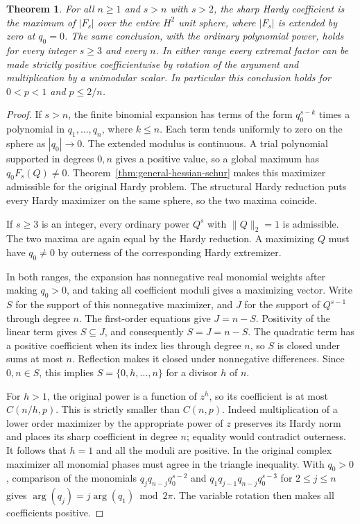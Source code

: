 \documentclass[11pt]{article}
\newtheorem{theorem}{Theorem}
\begin{document}
\begin{theorem}\label{thm:general-small-positive}
For all \(n\ge1\) and \(s>n\) with \(s>2\), the sharp Hardy
coefficient is the maximum of \(|F_s|\) over the entire
\(H^2\) unit sphere, where \(|F_s|\) is extended by zero at
\(q_0=0\). The same conclusion, with the ordinary polynomial
power, holds for every integer \(s\ge3\) and every \(n\).
In either range every extremal factor can be made strictly
positive coefficientwise by rotation of the argument and
multiplication by a unimodular scalar. In particular this
conclusion holds for \(0<p<1\) and \(p\le 2/n\).
\end{theorem}

\begin{proof}
If \(s>n\), the finite binomial expansion has terms of the
form \(q_0^{s-k}\) times a polynomial in \(q_1,\ldots,q_n\),
where \(k\le n\). Each term tends uniformly to zero on the
sphere as \(|q_0|\to0\). The extended modulus is continuous.
A trial polynomial supported in degrees \(0,n\) gives a
positive value, so a global maximum has \(q_0F_s(Q)\ne0\).
Theorem~\ref{thm:general-hessian-schur} makes this maximizer
admissible for the original Hardy problem. The structural
Hardy reduction puts every Hardy maximizer on the same sphere,
so the two maxima coincide.

If \(s\ge3\) is an integer, every ordinary power \(Q^s\) with
\(\|Q\|_2=1\) is admissible. The two maxima are again equal by
the Hardy reduction. A maximizing \(Q\) must have \(q_0\ne0\)
by outerness of the corresponding Hardy extremizer.

In both ranges, the expansion has nonnegative real
monomial weights after making \(q_0>0\), and taking all
coefficient moduli gives a maximizing vector. Write \(S\)
for the support of this nonnegative maximizer, and \(J\)
for the support of \(Q^{s-1}\) through degree \(n\).
The first-order equations give \(J=n-S\). Positivity of the
linear term gives \(S\subseteq J\), and consequently
\(S=J=n-S\). The quadratic term has a positive coefficient
when its index lies through degree \(n\), so \(S\) is closed
under sums at most \(n\). Reflection makes it closed
under nonnegative differences. Since \(0,n\in S\), this
implies \(S=\{0,h,\ldots,n\}\) for a divisor \(h\) of \(n\).

For \(h>1\), the original power is a function of \(z^h\),
so its coefficient is at most \(C(n/h,p)\). This is strictly
smaller than \(C(n,p)\). Indeed multiplication of a lower
order maximizer by the appropriate power of \(z\) preserves
its Hardy norm and places its sharp coefficient in degree
\(n\); equality would contradict outerness.
It follows that \(h=1\) and all the moduli are positive.
In the original complex maximizer all monomial phases
must agree in the triangle inequality. With \(q_0>0\),
comparison of the monomials
\(q_jq_{n-j}q_0^{s-2}\) and
\(q_1q_{j-1}q_{n-j}q_0^{s-3}\) for \(2\le j\le n\)
gives \(\arg(q_j)=j\arg(q_1)\bmod 2\pi\).
The variable rotation then makes all coefficients positive.
\end{proof}
\end{document}

